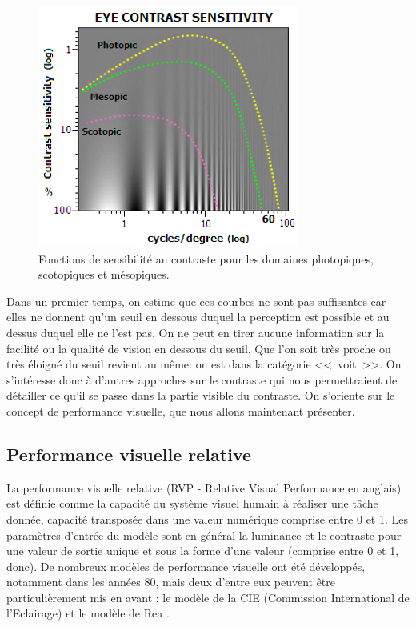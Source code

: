 	\begin{figure}
		\centering
		\includegraphics[scale=.9]{Figures/EyeContrastSensitivity}
		\caption{Fonctions de sensibilité au contraste pour les domaines photopiques, scotopiques et mésopiques.}
		\label{fig:fonction_sensibilite_contraste}
	\end{figure}
	
	\par Dans un premier temps, on estime que ces courbes ne sont pas suffisantes car elles ne donnent qu'un seuil en dessous duquel la perception est possible et au dessus duquel elle ne l'est pas. On ne peut en tirer aucune information sur la facilité ou la qualité de vision en dessous du seuil. Que l'on soit très proche ou très éloigné du seuil revient au même: on est dans la catégorie <<~voit~>>. On s'intéresse donc à d'autres approches sur le contraste qui nous permettraient de détailler ce qu'il se passe dans la partie visible du contraste. On s'oriente sur le concept de performance visuelle, que nous allons maintenant présenter.
	
	\subsection{Performance visuelle relative}	
	\par La performance visuelle relative (RVP - Relative Visual Performance en anglais) est définie comme la capacité du système visuel humain à réaliser une tâche donnée, capacité transposée dans une valeur numérique comprise entre 0 et 1. Les paramètres d'entrée du modèle sont en général la luminance et le contraste pour une valeur de sortie unique et sous la forme d'une valeur (comprise entre 0 et 1, donc). De nombreux modèles de performance visuelle ont été développés, notamment dans les années 80, mais deux d'entre eux peuvent être particulièrement mis en avant : le modèle de la CIE (Commission International de l'Eclairage) \citep{international_commission_on_illumination_analytic_1981} et le modèle de Rea \citep{rea_toward_1986}.
	
